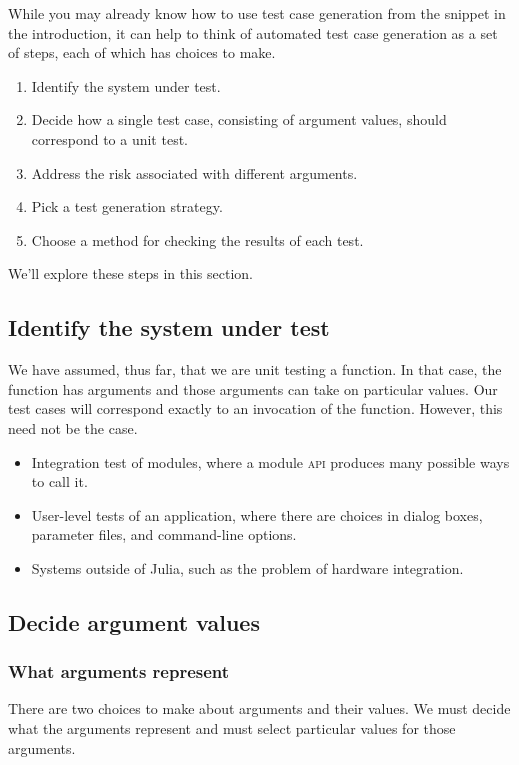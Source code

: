 \documentclass{juliacon}
\begin{document}
While you may already know how to use test case generation from the snippet in the introduction, it can help to think of automated test case generation as a set of steps, each of which has choices to make.
\begin{enumerate}
   \item Identify the system under test.
   \item Decide how a single test case, consisting of argument values, should correspond to a unit test.
   \item Address the risk associated with different arguments.
   \item Pick a test generation strategy.
   \item Choose a method for checking the results of each test.
\end{enumerate}
We'll explore these steps in this section.

\subsection{Identify the system under test}

We have assumed, thus far, that we are unit testing a function. In that case, the function has arguments and those arguments can take on particular values. Our test cases will correspond exactly to an invocation of the function. However, this need not be the case.

\begin{itemize}
\item Integration test of modules, where a module \textsc{api} produces many possible ways to call it.
\item User-level tests of an application, where there are choices in dialog boxes, parameter files, and command-line options.
\item Systems outside of Julia, such as the problem of hardware integration.
\end{itemize}

\subsection{Decide argument values}

\subsubsection{What arguments represent}
There are two choices to make about arguments and their values. We must decide what the arguments represent and must select particular values for those arguments.
\end{document}
